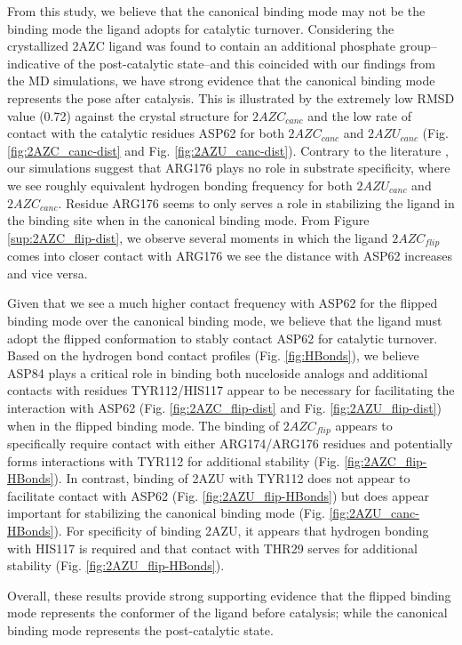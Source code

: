\documentclass[fleqn,10pt]{wlscirep}
\newcommand{\angstrom}{\text{\normalfont\AA}}
\begin{document}
From this study, we believe that the canonical binding mode may not be the binding mode the ligand adopts for catalytic turnover.
Considering the crystallized 2AZC ligand was found to contain an additional phosphate group--indicative of the post-catalytic state--and this coincided with our findings from the MD simulations, we have strong evidence that the canonical binding mode represents the pose after catalysis.
This is illustrated by the extremely low RMSD value (0.72\angstrom) against the crystal structure for $2AZC_{canc}$ and the low rate of contact with the catalytic residues ASP62 for both $2AZC_{canc}$ and $2AZU_{canc}$ (Fig. \ref{fig:2AZC_canc-dist} and Fig. \ref{fig:2AZU_canc-dist}).
Contrary to the literature \cite{tanaka2016molecular}, our simulations suggest that ARG176 plays no role in substrate specificity, where we see roughly equivalent hydrogen bonding frequency for both $2AZU_{canc}$ and $2AZC_{canc}$.
Residue ARG176 seems to only serves a role in stabilizing the ligand in the binding site when in the canonical binding mode.
From Figure \ref{sup:2AZC_flip-dist}, we observe several moments in which the ligand $2AZC_{flip}$ comes into closer contact with ARG176 we see the distance with ASP62 increases and vice versa.

Given that we see a much higher contact frequency with ASP62 for the flipped binding mode over the canonical binding mode, we believe that the ligand must adopt the flipped conformation to stably contact ASP62 for catalytic turnover.
Based on the hydrogen bond contact profiles (Fig. \ref{fig:HBonds}), we believe ASP84 plays a critical role in binding both nuceloside analogs and additional contacts with residues TYR112/HIS117 appear to be necessary for facilitating the interaction with ASP62 (Fig. \ref{fig:2AZC_flip-dist} and Fig. \ref{fig:2AZU_flip-dist}) when in the flipped binding mode.
The binding of $2AZC_{flip}$ appears to specifically require contact with either ARG174/ARG176 residues and potentially forms interactions with TYR112 for additional stability (Fig. \ref{fig:2AZC_flip-HBonds}).
In contrast, binding of 2AZU with TYR112 does not appear to facilitate contact with ASP62 (Fig. \ref{fig:2AZU_flip-HBonds}) but does appear important for stabilizing the canonical binding mode (Fig. \ref{fig:2AZU_canc-HBonds}).
For specificity of binding 2AZU, it appears that hydrogen bonding with HIS117 is required and that contact with THR29 serves for additional stability (Fig. \ref{fig:2AZU_flip-HBonds}).

Overall, these results provide strong supporting evidence that the flipped binding mode represents the conformer of the ligand before catalysis; while the canonical binding mode represents the post-catalytic state.
\end{document}
